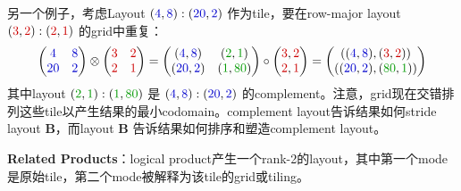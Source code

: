\documentclass{article}
\begin{document}
另一个例子，考虑Layout \( (\textcolor{blue}{4},\textcolor{blue}{8}) : (\textcolor{blue}{20},\textcolor{blue}{2}) \) 作为tile，要在row-major layout \( (\textcolor{red}{3},\textcolor{red}{2}) : (\textcolor{red}{2},\textcolor{red}{1}) \) 的grid中重复：
\[
\begin{pmatrix} \textcolor{blue}{4} & \textcolor{blue}{8} \\ \textcolor{blue}{20} & \textcolor{blue}{2} \end{pmatrix}
\otimes
\begin{pmatrix} \textcolor{red}{3} & \textcolor{red}{2} \\ \textcolor{red}{2} & \textcolor{red}{1} \end{pmatrix}
=
\begin{pmatrix} (\textcolor{blue}{4},\textcolor{blue}{8}) & (\textcolor{green}{2},\textcolor{green}{1}) \\ (\textcolor{blue}{20},\textcolor{blue}{2}) & (\textcolor{green}{1},\textcolor{green}{80}) \end{pmatrix}
\circ
\begin{pmatrix} \textcolor{red}{3},\textcolor{red}{2} \\ \textcolor{red}{2},\textcolor{red}{1} \end{pmatrix}
=
\begin{pmatrix} ((\textcolor{blue}{4},\textcolor{blue}{8}), (\textcolor{red}{3},\textcolor{red}{2})) \\ ((\textcolor{blue}{20},\textcolor{blue}{2}), (\textcolor{green}{80},\textcolor{green}{1})) \end{pmatrix}
\]
其中layout \( (\textcolor{green}{2},\textcolor{green}{1}) : (\textcolor{green}{1},\textcolor{green}{80}) \) 是 \( (\textcolor{blue}{4},\textcolor{blue}{8}) : (\textcolor{blue}{20},\textcolor{blue}{2}) \) 的complement。注意，grid现在交错排列这些tile以产生结果的最小codomain。complement layout告诉结果如何stride layout \( \mathbf{B} \)，而layout \( \mathbf{B} \) 告诉结果如何排序和塑造complement layout。

\textbf{Related Products}：logical product产生一个rank-2的layout，其中第一个mode是原始tile，第二个mode被解释为该tile的grid或tiling。
\end{document}
